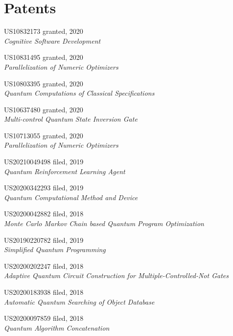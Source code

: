 \section{\sc Patents}

{\sc US10832173} \hfill {\sc granted}, 2020\\
\emph{Cognitive Software Development}

{\sc US10831495} \hfill {\sc granted}, 2020\\
\emph{Parallelization of Numeric Optimizers}

{\sc US10803395} \hfill {\sc granted}, 2020\\
\emph{Quantum Computations of Classical Specifications}

{\sc US10637480} \hfill {\sc granted}, 2020\\
\emph{Multi-control Quantum State Inversion Gate}

{\sc US10713055} \hfill {\sc granted}, 2020\\
\emph{Parallelization of Numeric Optimizers}

{\sc US20210049498} \hfill {\sc filed}, 2019\\
\emph{Quantum Reinforcement Learning Agent}

{\sc US20200342293} \hfill {\sc filed}, 2019\\
\emph{Quantum Computational Method and Device}

{\sc US20200042882} \hfill {\sc filed}, 2018\\
\emph{Monte Carlo Markov Chain based Quantum Program Optimization}

{\sc US20190220782} \hfill {\sc filed}, 2019\\
\emph{Simplified Quantum Programming}

{\sc US20200202247} \hfill {\sc filed}, 2018\\
\emph{Adaptive Quantum Circuit Construction for Multiple-Controlled-Not Gates}

{\sc US20200183938} \hfill {\sc filed}, 2018\\
\emph{Automatic Quantum Searching of Object Database}

{\sc US20200097859} \hfill {\sc filed}, 2018\\
\emph{Quantum Algorithm Concatenation}

